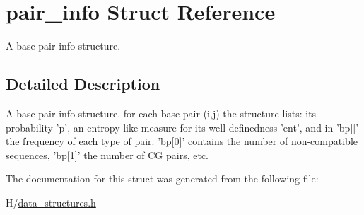\hypertarget{structpair__info}{
\section{pair\_\-info Struct Reference}
\label{structpair__info}
}


A base pair info structure.  




\subsection{Detailed Description}
A base pair info structure. for each base pair (i,j) the structure lists: its probability 'p', an entropy-\/like measure for its well-\/definedness 'ent', and in 'bp\mbox{[}\mbox{]}' the frequency of each type of pair. 'bp\mbox{[}0\mbox{]}' contains the number of non-\/compatible sequences, 'bp\mbox{[}1\mbox{]}' the number of CG pairs, etc. 

The documentation for this struct was generated from the following file:\begin{DoxyCompactItemize}
\item 
H/\hyperlink{data__structures_8h}{data\_\-structures.h}\end{DoxyCompactItemize}

